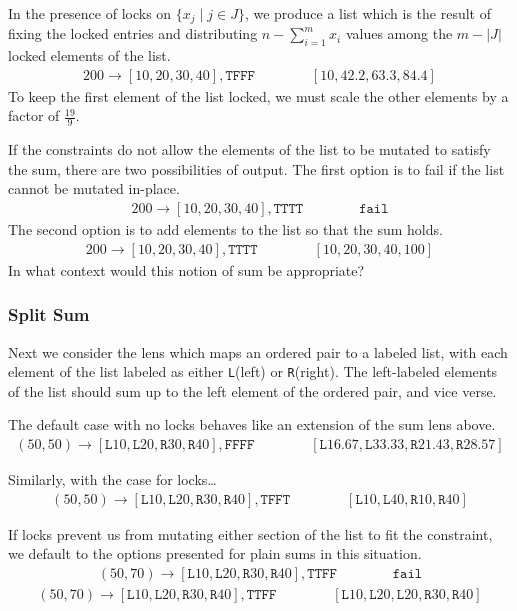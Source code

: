 \documentclass{article}
\newcommand\F{\texttt F}
\newcommand\T{\texttt T}
\renewcommand\L{\texttt L}
\newcommand\R{\texttt R}
\newcommand\Fail{\texttt{fail}}
\newcommand\form[4]{#1 \rightarrow #2, #3 \qquad \qquad #4}
\begin{document}
In the presence of locks on $\{x_j \mid j \in J\}$, we produce
a list which is the result of fixing the locked entries and 
distributing $n-\sum_{i=1}^m x_i$ values among the $m-|J|$ locked
elements of the list. 
\begin{align}
    \form {200} {[10,20,30,40]} {\T\F\F\F} {[10,42.2,63.3,84.4]}
\end{align}
To keep the first element of the list locked, we must scale
the other elements by a factor of $\frac {19} 9$. 

If the constraints do not allow the elements of the list
to be mutated to satisfy the sum, there are two possibilities
of output. The first option is to fail if the list cannot be mutated in-place.
\begin{align}
    \form {200} {[10,20,30,40]} {\T\T\T\T} {\Fail}
\end{align}
The second option is to add elements to the list so that the sum holds.
\begin{align}
    \form {200} {[10,20,30,40]} {\T\T\T\T} {[10,20,30,40,100]} 
\end{align}
In what context would this notion of sum be appropriate?

\subsubsection*{Split Sum}

Next we consider the lens which maps an ordered pair to
a labeled list, with each element of the list labeled 
as either \L (left) or \R (right). The left-labeled
elements of the list should sum up to the left element
of the ordered pair, and vice verse.

The default case with no locks behaves like an extension of the sum lens
above.
\begin{align}
    \form {(50,50)} {[\L10,\L20,\R30,\R40]} {\F\F\F\F} 
          {[\L16.67,\L33.33,\R21.43,\R28.57]}
\end{align}

Similarly, with the case for locks\ldots
\begin{align}
    \form {(50,50)} {[\L10,\L20,\R30,\R40]} {\T\F\F\T} 
          {[\L10,\L40,\R10,\R40]}
\end{align}

If locks prevent us from mutating either section of
the list to fit the constraint, we default to the options 
presented for plain sums in this situation.
\begin{align}
    \form {(50,70)} {[\L10,\L20,\R30,\R40]} {\T\T\F\F} {\Fail}
\end{align}
\begin{align}
    \form {(50,70)} {[\L10,\L20,\R30,\R40]} {\T\T\F\F} 
          {[\L10,\L20,\L20,\R30,\R40]}
\end{align}
\end{document}
